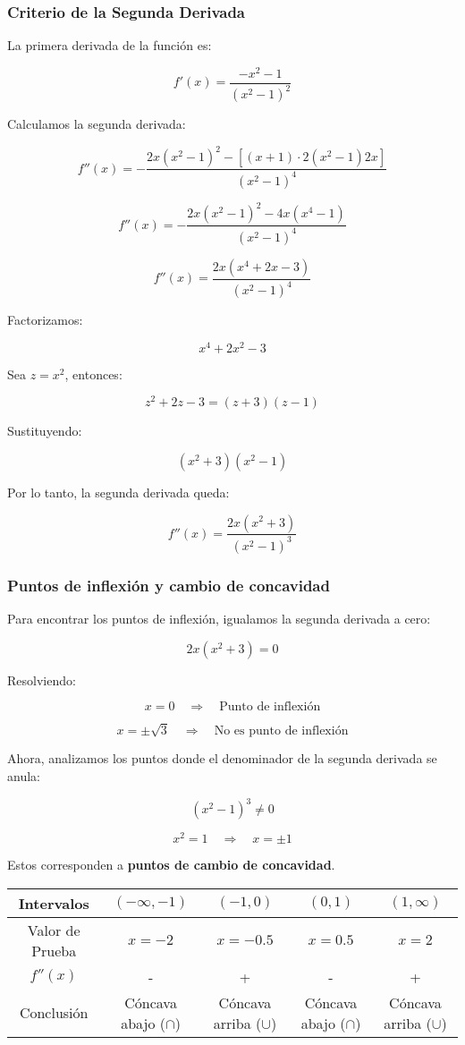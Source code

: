 \subsubsection*{Criterio de la Segunda Derivada}

La primera derivada de la función es:

\[
f'(x) = \frac{-x^2 -1}{(x^2 - 1)^2}
\]

Calculamos la segunda derivada:

\[
f''(x) = - \frac{2x (x^2 -1)^2 - \left[ (x+1) \cdot 2 (x^2 -1) 2x \right]}{(x^2 -1)^4}
\]

\[
f''(x) = - \frac{2x (x^2-1)^2 - 4x (x^4 -1)}{(x^2 -1)^4}
\]

\[
f''(x) = \frac{2x(x^4 + 2x -3)}{(x^2 - 1)^4}
\]

Factorizamos:

\[
x^4 + 2x^2 -3
\]

Sea \( z = x^2 \), entonces:

\[
z^2 + 2z -3 = (z+3)(z-1)
\]

Sustituyendo:

\[
(x^2+3)(x^2-1)
\]

Por lo tanto, la segunda derivada queda:

\[
f''(x) = \frac{2x (x^2+3)}{(x^2 -1)^3}
\]

\subsubsection*{Puntos de inflexión y cambio de concavidad}

Para encontrar los puntos de inflexión, igualamos la segunda derivada a cero:

\[
2x(x^2+3) = 0
\]

Resolviendo:

\[
x = 0 \quad \Rightarrow \quad \text{Punto de inflexión}
\]

\[
x = \pm \sqrt{3} \quad \Rightarrow \quad \text{No es punto de inflexión}
\]

Ahora, analizamos los puntos donde el denominador de la segunda derivada se anula:

\[
(x^2 -1)^3 \neq 0
\]

\[
x^2 = 1 \quad \Rightarrow \quad x = \pm 1
\]

Estos corresponden a \textbf{puntos de cambio de concavidad}.

\begin{center}
    \begin{tabular}{|c|c|c|c|c|}
        \hline
        Intervalos & $(-\infty,-1)$ & $(-1,0)$ & $(0,1)$ & $(1,\infty)$ \\
        \hline
        Valor de Prueba & $x=-2$ & $x=-0.5$ & $x=0.5$ & $x=2$ \\
        \hline
        $f''(x)$ & - & + & - & + \\
        \hline
        Conclusión & Cóncava abajo ($\cap$) & Cóncava arriba ($\cup$) & Cóncava abajo ($\cap$) & Cóncava  arriba ($\cup$) \\
        \hline
    \end{tabular}
\end{center}


